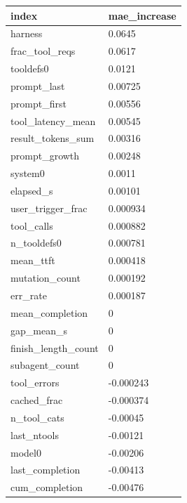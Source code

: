 \begin{tabular}{ll}
\toprule
index & mae\_increase \\
\midrule
harness & 0.0645 \\
frac\_tool\_reqs & 0.0617 \\
tooldefs0 & 0.0121 \\
prompt\_last & 0.00725 \\
prompt\_first & 0.00556 \\
tool\_latency\_mean & 0.00545 \\
result\_tokens\_sum & 0.00316 \\
prompt\_growth & 0.00248 \\
system0 & 0.0011 \\
elapsed\_s & 0.00101 \\
user\_trigger\_frac & 0.000934 \\
tool\_calls & 0.000882 \\
n\_tooldefs0 & 0.000781 \\
mean\_ttft & 0.000418 \\
mutation\_count & 0.000192 \\
err\_rate & 0.000187 \\
mean\_completion & 0 \\
gap\_mean\_s & 0 \\
finish\_length\_count & 0 \\
subagent\_count & 0 \\
tool\_errors & -0.000243 \\
cached\_frac & -0.000374 \\
n\_tool\_cats & -0.00045 \\
last\_ntools & -0.00121 \\
model0 & -0.00206 \\
last\_completion & -0.00413 \\
cum\_completion & -0.00476 \\
\bottomrule
\end{tabular}